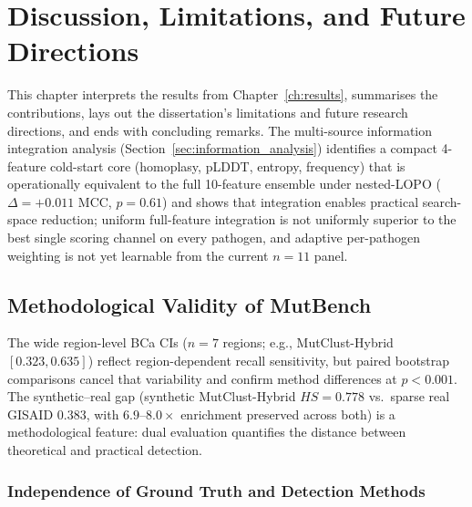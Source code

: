 \chapter{Discussion, Limitations, and Future Directions}
\label{ch:discussion}

This chapter interprets the results from Chapter~\ref{ch:results}, summarises the contributions, lays out the dissertation's limitations and future research directions, and ends with concluding remarks. The multi-source information integration analysis (Section~\ref{sec:information_analysis}) identifies a compact 4-feature cold-start core (homoplasy, pLDDT, entropy, frequency) that is operationally equivalent to the full 10-feature ensemble under nested-LOPO ($\Delta = +0.011$ MCC, $p = 0.61$) and shows that integration enables practical search-space reduction; uniform full-feature integration is not uniformly superior to the best single scoring channel on every pathogen, and adaptive per-pathogen weighting is not yet learnable from the current $n = 11$ panel.

\section{Methodological Validity of MutBench}

The wide region-level BCa CIs ($n = 7$ regions; e.g., MutClust-Hybrid $[0.323, 0.635]$) reflect region-dependent recall sensitivity, but paired bootstrap comparisons cancel that variability and confirm method differences at $p < 0.001$. \label{sec:bootstrap_interpretation} The synthetic--real gap (synthetic MutClust-Hybrid $\mathit{HS} = 0.778$ vs.\ sparse real GISAID $0.383$, with $6.9$--$8.0\times$ enrichment preserved across both) is a methodological feature: dual evaluation quantifies the distance between theoretical and practical detection. \label{sec:synthetic_real_gap}

\subsection{Independence of Ground Truth and Detection Methods}
\label{sec:circularity}

